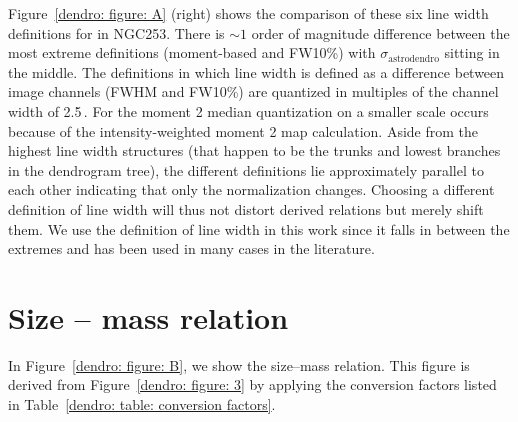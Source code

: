 Figure~\ref{dendro: figure: A} (right) shows the comparison of these six line width definitions for  in NGC253.
There is $\sim 1$ order of magnitude difference between the most extreme definitions (moment-based and FW10\%) with $\sigma_\mathrm{astrodendro}$ sitting in the middle.
The definitions in which line width is defined as a difference between image channels (FWHM and FW10\%) are quantized in multiples of the channel width of 2.5\,\kms. For the moment 2 median quantization on a smaller scale occurs because of the intensity-weighted moment 2 map calculation.
Aside from the highest line width structures (that happen to be the trunks and lowest branches in the dendrogram tree), the different definitions lie approximately parallel to each other indicating that only the normalization changes. Choosing a different definition of line width will thus not distort derived relations but merely shift them.
We use the \astrodendro definition of line width in this work since it falls in between the extremes and has been used in many cases in the literature.



\section{Size -- mass relation}
\label{appendix: dendro: size mass}

In Figure~\ref{dendro: figure: B}, we show the size--mass relation. This figure is derived from Figure~\ref{dendro: figure: 3} by applying the conversion factors listed in Table~\ref{dendro: table: conversion factors}.

